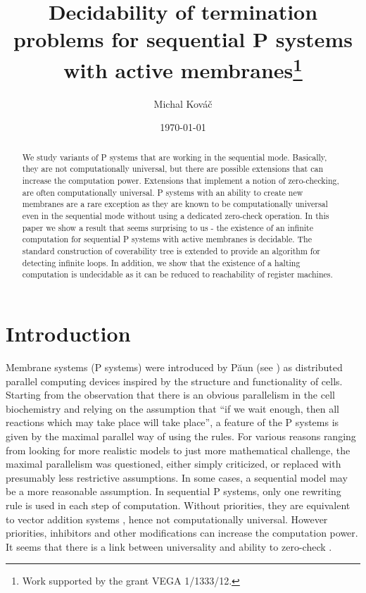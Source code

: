 \documentclass[llncs,submission,copyright,creativecommons]{../lib/lncs/llncs}
\begin{document}
\title{Decidability of termination problems for sequential P systems with active membranes\thanks{Work supported by the grant VEGA 1/1333/12.}}
\author{Michal Kováč}
\date{\today}
\maketitle

\begin{abstract}
We study variants of P systems that are working in the sequential mode. Basically, they are not computationally universal, but there are possible extensions that can increase the computation power. Extensions that implement a notion of zero-checking, are often computationally universal.
P systems with an ability to create new membranes are a rare exception as they are known to be computationally universal even in the sequential mode without using a dedicated zero-check operation.
In this paper we show a result that seems surprising to us - the existence of an infinite computation for sequential P systems with active membranes is decidable. The standard construction of coverability tree is extended to provide an algorithm for detecting infinite loops.
In addition, we show that the existence of a halting computation is undecidable as it can be reduced to reachability of register machines.
\end{abstract}

\section{Introduction}
\label{sec:introduction}


Membrane systems (P systems) \cite{Paun10OxfordHandbookMembraneComputing} were introduced by P\u{a}un (see \cite{Paun2000108}) as distributed parallel computing devices inspired by the structure and functionality of cells. Starting from the observation that there is an obvious parallelism in the cell biochemistry and relying on the assumption that ``if we wait enough, then all reactions which may take place will take place'', a feature of the P systems is given by the maximal parallel way of using the rules. For various reasons ranging from looking for more realistic models to just more mathematical challenge, the maximal parallelism was questioned, either simply criticized, or replaced with presumably less restrictive assumptions.
In some cases, a sequential model may be a more reasonable assumption. In sequential P systems, only one rewriting rule is used in each step of computation. Without priorities, they are equivalent to vector addition systems \cite{Ibarra05Active}, hence not computationally universal. However priorities, inhibitors and other modifications can increase the computation power. It seems that there is a link between universality and ability to zero-check \cite{Alhazov12Properties}.
\end{document}
